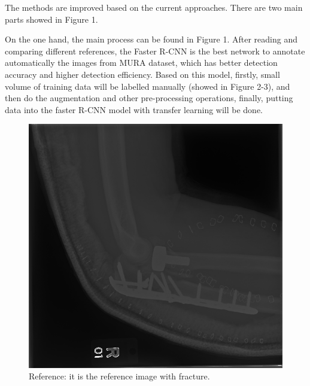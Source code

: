 \documentclass[12pt,oneside,a4paper]{article}
\begin{document}
The methods are improved based on the current approaches. There are two main parts showed in Figure 1.
\par On the one hand, the main process can be found in Figure 1. After reading and comparing different references, the Faster R-CNN is the best network to annotate automatically the images from MURA dataset, which has better detection accuracy and higher detection efficiency. Based on this model, firstly, small volume of training data will be labelled manually (showed in Figure 2-3), and then do the augmentation and other pre-processing operations, finally, putting data into the faster R-CNN model with transfer learning will be done. 
\begin{figure}[htbp] %
\begin{minipage}[t]{0.5\textwidth}%
\centering
\includegraphics[width=\textwidth]{images/reference.png}
 \caption{Reference: it is the reference image with fracture.}
\end{minipage}
\begin{minipage}[t]{0.5\textwidth}
\centering

\end{minipage}
\end{figure}
\end{document}
